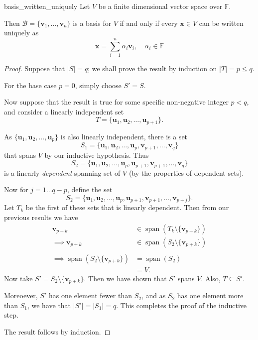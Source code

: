 \begin{theorem}{\cite{math2601_notes}}{basis_written_uniquely}
	Let $V$ be a finite dimensional vector space over $\mathbb{F}$.

	Then $\mathcal{B} = \{ \mathbf{v}_1, \ldots, \mathbf{v}_n \}$ is a basis for $V$ if and only if every $\mathbf{x} \in V$ can be written uniquely as
	$$ \mathbf{x} = \sum_{i = 1}^{n} \alpha_i \mathbf{v}_i, \quad \alpha_i \in \mathbb{F} $$

	\begin{proof}
		Suppose that $\lvert S \rvert = q$; we shall prove the result by induction on $\lvert T \rvert = p \leq q$.

		For the base case $p = 0$, simply choose $S' = S$.

		Now suppose that the result is true for some specific non-negative integer $p < q$, and consider a linearly independent set
		$$ T = \{ \mathbf{u}_1, \mathbf{u}_2, \ldots, \mathbf{u}_{p+1} \} . $$

		As $\{ \mathbf{u}_1, \mathbf{u}_2, \ldots, \mathbf{u}_{p} \}$ is also linearly independent, there is a set
		$$ S_1 = \{ \mathbf{u}_1, \mathbf{u}_2, \ldots, \mathbf{u}_{p}, \mathbf{v}_{p+1}, \ldots, \mathbf{v}_q \} $$
		that spans $V$ by our inductive hypothesis. Thus
		$$ S_2 = \{ \mathbf{u}_1, \mathbf{u}_2, \ldots, \mathbf{u}_{p}, \mathbf{u}_{p+1}, \mathbf{v}_{p+1}, \ldots, \mathbf{v}_q \} $$
		is a linearly \textit{dependent} spanning set of $V$ (by the properties of dependent sets).

		Now for $j = 1 \ldots q - p$, define the set
		$$ S_2 = \{ \mathbf{u}_1, \mathbf{u}_2, \ldots, \mathbf{u}_{p}, \mathbf{u}_{p+1}, \mathbf{v}_{p+1}, \ldots, \mathbf{v}_{p+j} \} . $$
		Let $T_k$ be the first of these sets that is linearly dependent. Then from our previous results we have
			\begin{align*}
				\mathbf{v}_{p+k} &\in \operatorname{span} (T_k \setminus \{ \mathbf{v}_{p+k} \}) \\
				\implies \mathbf{v}_{p+k} &\in \operatorname{span} (S_2 \setminus \{ \mathbf{v}_{p+k} \}) \\
				\\
				\implies \operatorname{span} (S_2 \setminus \{ \mathbf{v}_{p+k} \}) &= \operatorname{span} (S_2) \\
				&= V .
			\end{align*}
		Now take $S' = S_2 \setminus \{ \mathbf{v}_{p+k} \}$. Then we have shown that $S'$ spans $V$. Also, $T \subseteq S'$.

		Moreoever, $S'$ has one element fewer than $S_2$, and as $S_2$ has one element more than $S_1$, we have that $\lvert S' \rvert = \lvert S_1 \rvert = q$. This completes the proof of the inductive step.

		The result follows by induction.
	\end{proof}
\end{theorem}

